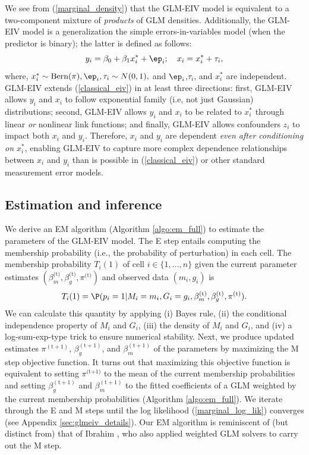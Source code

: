 \documentclass[11pt]{article}
\begin{document}
We see from (\ref{marginal_density}) that the GLM-EIV model is equivalent to a two-component mixture of \textit{products} of GLM densities. Additionally, the GLM-EIV model is a generalization the simple errors-in-variables model (when the predictor is binary); the latter is defined as follows:
\begin{equation}\label{classical_eiv}
y_i = \beta_0 + \beta_1 x^*_i + \ep_i; \quad
x_i = x^*_i + \tau_i,
\end{equation}
where, $x^*_i \sim \textrm{Bern}(\pi), \ep_i, \tau_i \sim N(0,1),$ and $\ep_i$,$\tau_i$, and $x^*_i$ are independent. GLM-EIV extends (\ref{classical_eiv}) in at least three directions: first, GLM-EIV allows $y_i$ and $x_i$ to follow exponential family (i.e, not just Gaussian) distributions; second, GLM-EIV allows $y_i$ and $x_i$ to be related to $x^*_i$ through linear \textit{or} nonlinear link functions; and finally, GLM-EIV allows confounders $z_i$ to impact both $x_i$ and $y_i$. Therefore, $x_i$ and $y_i$ are dependent \textit{even after conditioning on $x^*_i$}, enabling GLM-EIV to capture more complex dependence relationships between $x_i$ and $y_i$ than is possible in (\ref{classical_eiv}) or other standard measurement error models.

\subsection{Estimation and inference}

We derive an EM algorithm (Algorithm \ref{algo:em_full}) to estimate the parameters of the GLM-EIV model. The E step entails computing the membership probability (i.e., the probability of perturbation) in each cell. The membership probability $T_i(1)$ of cell $i \in \{1, \dots, n\}$ given the current parameter estimates $(\beta_m^\textrm{(t)}, \beta_g^\textrm{(t)}, \pi^\textrm{(t)})$ and observed data $(m_i, g_i)$ is
$$T_i(1) = \P(p_i = 1| M_i = m_i, G_i = g_i, \beta^\textrm{(t)}_m, \beta^\textrm{(t)}_g, \pi^\textrm{(t)}).$$ We can calculate this quantity by applying (i) Bayes rule, (ii) the conditional independence property of $M_i$ and $G_i$, (iii) the density of $M_i$ and $G_i$, and (iv) a log-sum-exp-type trick to ensure numerical stability. Next, we produce updated estimates $\pi^{(\textrm{t} +1)}$, $\beta_g^{(\textrm{t}+1)}$, and $\beta_m^{(\textrm{t}+1)}$ of the parameters by maximizing the M step objective function. It turns out that maximizing this objective function is equivalent to setting $\pi^{\textrm{(t+1)}}$ to the mean of the current membership probabilities and setting $\beta_g^{(\textrm{t}+1)}$ and $\beta_m^{(\textrm{t}+1)}$ to the fitted coefficients of a GLM weighted by the current membership probabilities (Algorithm \ref{algo:em_full}). We iterate through the E and M steps until the log likelihood (\ref{marginal_log_lik}) converges (see Appendix \ref{sec:glmeiv_details}). Our EM algorithm is reminiscent of (but distinct from) that of Ibrahim \cite{Ibrahim1990}, who also applied weighted GLM solvers to carry out the M step.
\end{document}
